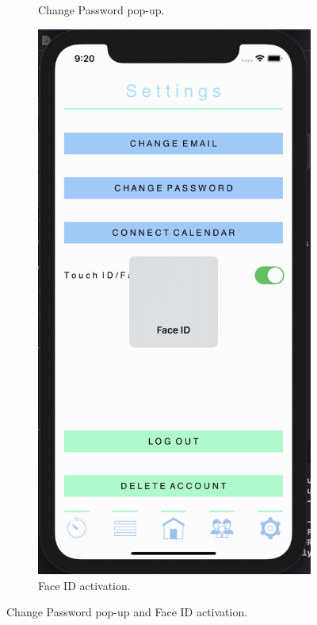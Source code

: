 \begin{figure}[H]
\begin{subfigure}[b]{0.3\textwidth}
        \caption{Change Password pop-up.}
        \label{fig:change_password_app}
    \end{subfigure}
    \hfill
    \begin{subfigure}[b]{0.3\textwidth}
        \centering
        \includegraphics[width=\textwidth]{./graphics/Implementation/Settings/faceid.png}
        \caption{Face ID activation.}
        \label{fig:faceid_app}
    \end{subfigure}
    
    \caption{Change Password pop-up and Face ID activation.}
    \label{fig:change_password_faceid}
\end{figure}